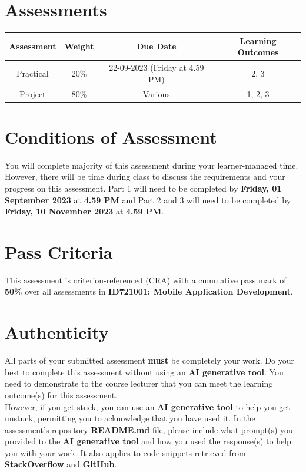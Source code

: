 \documentclass{article}
\begin{document}
\section*{Assessments}
\renewcommand{\arraystretch}{1.5}
\begin{tabular}{|c|c|c|c|}
	\hline
	\textbf{Assessment} & \textbf{Weight} & \textbf{Due Date}    & \textbf{Learning Outcomes} \\ \hline
	Practical          & 20\%            & 22-09-2023 (Friday at 4.59 PM)  & 2, 3                    \\ \hline
	Project           & 80\%            & Various  & 1, 2, 3                    \\ \hline
\end{tabular}

\section*{Conditions of Assessment}
You will complete majority of this assessment during your learner-managed time. However, there will be time during class to discuss the requirements and your progress on this assessment. Part 1 will need to be completed by \textbf{Friday, 01 September 2023} at \textbf{4.59 PM} and Part 2 and 3 will need to be completed by \textbf{Friday, 10 November 2023} at \textbf{4.59 PM}.

\section*{Pass Criteria}
This assessment is criterion-referenced (CRA) with a cumulative pass mark of \textbf{50\%} over all assessments in \textbf{ID721001: Mobile Application Development}.

\section*{Authenticity}
All parts of your submitted assessment \textbf{must} be completely your work. Do your best to complete this assessment without using an \textbf{AI generative tool}. You need to demonstrate to the course lecturer that you can meet the learning outcome(s) for this assessment. \\
 
 However, if you get stuck, you can use an \textbf{AI generative tool} to help you get unstuck, permitting you to acknowledge that you have used it. In the assessment's repository \textbf{README.md} file, please include what prompt(s) you provided to the \textbf{AI generative tool} and how you used the response(s) to help you with your work. It also applies to code snippets retrieved from \textbf{StackOverflow} and \textbf{GitHub}. \\
 
\end{document}
